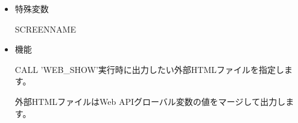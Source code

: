 \begin{itemize}
\item{特殊変数}

  SCREENNAME

\item{機能}

CALL 'WEB\_SHOW'実行時に出力したい外部HTMLファイルを指定します。

外部HTMLファイルはWeb APIグローバル変数の値をマージして出力します。

\end{itemize}


